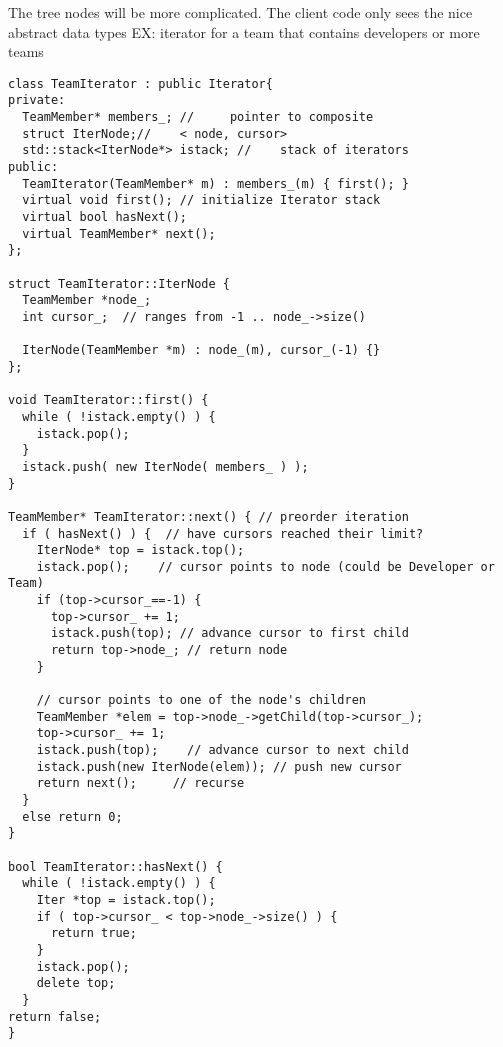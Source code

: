 \documentclass[12pt]{article}
\begin{document}
The tree nodes will be more complicated. The client code only sees the nice abstract data types
EX: iterator for a team that contains developers or more teams
\begin{lstlisting}
class TeamIterator : public Iterator{
private:
  TeamMember* members_; //     pointer to composite
  struct IterNode;//    < node, cursor>
  std::stack<IterNode*> istack; //    stack of iterators
public:
  TeamIterator(TeamMember* m) : members_(m) { first(); }
  virtual void first(); // initialize Iterator stack
  virtual bool hasNext();
  virtual TeamMember* next();
};

struct TeamIterator::IterNode {
  TeamMember *node_;
  int cursor_;  // ranges from -1 .. node_->size()

  IterNode(TeamMember *m) : node_(m), cursor_(-1) {}
};

void TeamIterator::first() {
  while ( !istack.empty() ) {
    istack.pop();
  }
  istack.push( new IterNode( members_ ) );
}

TeamMember* TeamIterator::next() { // preorder iteration
  if ( hasNext() ) {  // have cursors reached their limit?
    IterNode* top = istack.top();
    istack.pop();    // cursor points to node (could be Developer or Team)
    if (top->cursor_==-1) {
      top->cursor_ += 1;
      istack.push(top); // advance cursor to first child
      return top->node_; // return node
    }

    // cursor points to one of the node's children
    TeamMember *elem = top->node_->getChild(top->cursor_);
    top->cursor_ += 1;
    istack.push(top);    // advance cursor to next child
    istack.push(new IterNode(elem)); // push new cursor
    return next();     // recurse
  }
  else return 0;
}

bool TeamIterator::hasNext() {
  while ( !istack.empty() ) {
    Iter *top = istack.top();
    if ( top->cursor_ < top->node_->size() ) {
      return true;
    }
    istack.pop();
    delete top;
  }
return false;
}

\end{lstlisting}
\end{document}
